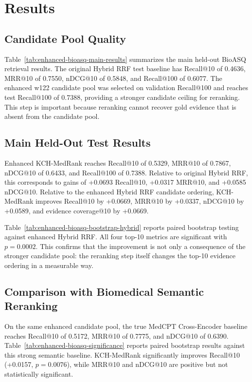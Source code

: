 \section{Results}

\subsection{Candidate Pool Quality}

Table~\ref{tab:enhanced-bioasq-main-results} summarizes the main held-out BioASQ retrieval results. The original Hybrid RRF test baseline has Recall@10 of 0.4636, MRR@10 of 0.7550, nDCG@10 of 0.5848, and Recall@100 of 0.6077. The enhanced w122 candidate pool was selected on validation Recall@100 and reaches test Recall@100 of 0.7388, providing a stronger candidate ceiling for reranking. This step is important because reranking cannot recover gold evidence that is absent from the candidate pool.



\subsection{Main Held-Out Test Results}

Enhanced KCH-MedRank reaches Recall@10 of 0.5329, MRR@10 of 0.7867, nDCG@10 of 0.6433, and Recall@100 of 0.7388. Relative to original Hybrid RRF, this corresponds to gains of +0.0693 Recall@10, +0.0317 MRR@10, and +0.0585 nDCG@10. Relative to the enhanced Hybrid RRF candidate ordering, KCH-MedRank improves Recall@10 by +0.0669, MRR@10 by +0.0337, nDCG@10 by +0.0589, and evidence coverage@10 by +0.0669.

Table~\ref{tab:enhanced-bioasq-bootstrap-hybrid} reports paired bootstrap testing against enhanced Hybrid RRF. All four top-10 metrics are significant with $p=0.0002$. This confirms that the improvement is not only a consequence of the stronger candidate pool: the reranking step itself changes the top-10 evidence ordering in a measurable way.



\subsection{Comparison with Biomedical Semantic Reranking}

On the same enhanced candidate pool, the true MedCPT Cross-Encoder baseline reaches Recall@10 of 0.5172, MRR@10 of 0.7775, and nDCG@10 of 0.6390. Table~\ref{tab:enhanced-bioasq-significance} reports paired bootstrap results against this strong semantic baseline. KCH-MedRank significantly improves Recall@10 (+0.0157, $p=0.0076$), while MRR@10 and nDCG@10 are positive but not statistically significant.

